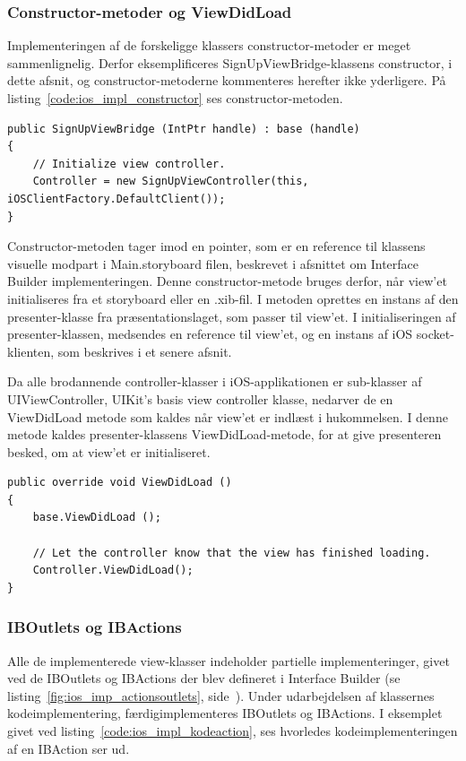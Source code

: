 \subsubsection{Constructor-metoder og ViewDidLoad}
Implementeringen af de forskeligge klassers constructor-metoder er meget sammenlignelig. Derfor eksemplificeres SignUpViewBridge-klassens constructor, i dette afsnit, og constructor-metoderne kommenteres herefter ikke yderligere. På listing~\ref{code:ios_impl_constructor} ses constructor-metoden.

\begin{lstlisting}[caption={SignUpViewBridge(...)},label={code:ios_impl_constructor}]
public SignUpViewBridge (IntPtr handle) : base (handle)
{
	// Initialize view controller.
	Controller = new SignUpViewController(this, iOSClientFactory.DefaultClient());
}
\end{lstlisting}

Constructor-metoden tager imod en pointer, som er en reference til klassens visuelle modpart i Main.storyboard filen, beskrevet i afsnittet om Interface Builder implementeringen. Denne constructor-metode bruges derfor, når view'et initialiseres fra et storyboard eller en .xib-fil. I metoden oprettes en instans af den presenter-klasse fra præsentationslaget, som passer til view'et. I initialiseringen af presenter-klassen, medsendes en reference til view'et, og en instans af iOS socket-klienten, som beskrives i et senere afsnit.

Da alle brodannende controller-klasser i iOS-applikationen er sub-klasser af UIViewController, UIKit's basis view controller klasse, nedarver de en ViewDidLoad metode som kaldes når view'et er indlæst i hukommelsen. I denne metode kaldes presenter-klassens ViewDidLoad-metode, for at give presenteren besked, om at view'et er initialiseret.

\begin{lstlisting}[caption={ViewDidLoad() i SignUpViewBridge},label={code:ios_impl_viewdidload}]
public override void ViewDidLoad ()
{
	base.ViewDidLoad ();
	
	// Let the controller know that the view has finished loading.
	Controller.ViewDidLoad();
}
\end{lstlisting}

\subsubsection{IBOutlets og IBActions}
Alle de implementerede view-klasser indeholder partielle implementeringer, givet ved de IBOutlets og IBActions der blev defineret i Interface Builder (se listing~\ref{fig:ios_imp_actionsoutlets}, side~\pageref{fig:ios_imp_actionsoutlets}). Under udarbejdelsen af klassernes kodeimplementering, færdigimplementeres IBOutlets og IBActions. I eksemplet givet ved listing~\ref{code:ios_impl_kodeaction}, ses hvorledes kodeimplementeringen af en IBAction ser ud.

